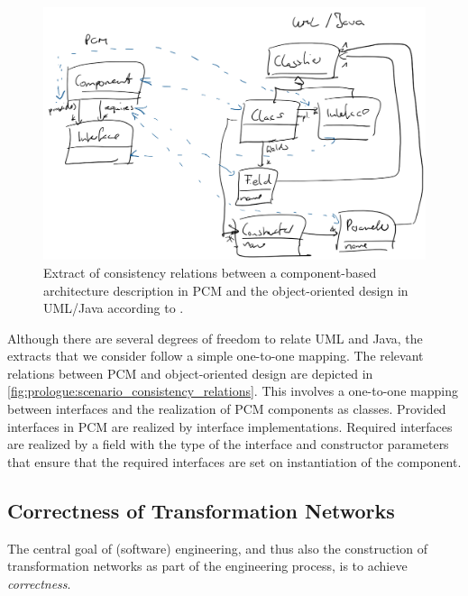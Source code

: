 \begin{figure}
    \centering
    \includegraphics[width=\textwidth]{figures/prologue/scenario_consistency_relations.png}
    \caption[Consistency relation for \gls{PCM} and \gls{UML}/Java]{Extract of consistency relations between a component-based architecture description in \gls{PCM} and the object-oriented design in \gls{UML}/Java according to \cite{langhammer2017a}.}
    \label{fig:prologue:scenario_consistency_relations}
\end{figure}

Although there are several degrees of freedom to relate \gls{UML} and Java, the extracts that we consider follow a simple one-to-one mapping.
The relevant relations between \gls{PCM} and object-oriented design are depicted in \autoref{fig:prologue:scenario_consistency_relations}.
This involves a one-to-one mapping between interfaces and the realization of \gls{PCM} components as classes. 
Provided interfaces in \gls{PCM} are realized by interface implementations. 
Required interfaces are realized by a field with the type of the interface and constructor parameters that ensure that the required interfaces are set on instantiation of the component.

\subsection{Correctness of Transformation Networks}

The central goal of (software) engineering, and thus also the construction of transformation networks as part of the engineering process, is to achieve \emph{correctness}.

